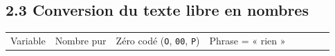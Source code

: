 \documentclass[

  french,

  10pt,

  a4paper,

]{article}
\newcounter{none} %
\begin{document}
\subsection{2.3 Conversion du texte libre en nombres}



{\def\LTcaptype{none} %

\begin{longtable}[]{@{}

  >{\raggedright\arraybackslash}p{}

  >{\raggedleft\arraybackslash}p{}

  >{\raggedleft\arraybackslash}p{}

  >{\raggedleft\arraybackslash}p{}

  >{\raggedleft\arraybackslash}p{}

  >{\raggedleft\arraybackslash}p{}

  >{\raggedleft\arraybackslash}p{}

  >{\raggedleft\arraybackslash}p{}@{}}

\toprule\noalign{}

\begin{minipage}[b]{\linewidth}\raggedright

Variable

\end{minipage} & \begin{minipage}[b]{\linewidth}\raggedleft

Nombre pur

\end{minipage} & \begin{minipage}[b]{\linewidth}\raggedleft

Zéro codé (\texttt{O}, \texttt{00}, \texttt{P})

\end{minipage} & \begin{minipage}[b]{\linewidth}\raggedleft

Phrase = « rien »

\end{minipage} & \begin{minipage}[b]{\linewidth}\raggedleft


\end{minipage}
\end{longtable}}
\end{document}
